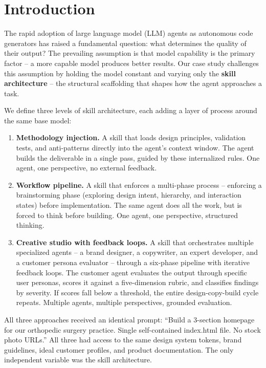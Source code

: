 \documentclass[conference]{IEEEtran}
\begin{document}
\section{Introduction}\label{introduction}

The rapid adoption of large language model (LLM) agents as autonomous code generators has raised a fundamental question: what determines the quality of their output? The prevailing assumption is that model capability is the primary factor -- a more capable model produces better results. Our case study challenges this assumption by holding the model constant and varying only the \textbf{skill architecture} -- the structural scaffolding that shapes how the agent approaches a task.

We define three levels of skill architecture, each adding a layer of process around the same base model:

\begin{enumerate}
\def\labelenumi{\arabic{enumi}.}
\item
  \textbf{Methodology injection.} A skill that loads design principles, validation tests, and anti-patterns directly into the agent's context window. The agent builds the deliverable in a single pass, guided by these internalized rules. One agent, one perspective, no external feedback.
\item
  \textbf{Workflow pipeline.} A skill that enforces a multi-phase process -- enforcing a brainstorming phase (exploring design intent, hierarchy, and interaction states) before implementation. The same agent does all the work, but is forced to think before building. One agent, one perspective, structured thinking.
\item
  \textbf{Creative studio with feedback loops.} A skill that orchestrates multiple specialized agents -- a brand designer, a copywriter, an expert developer, and a customer persona evaluator -- through a six-phase pipeline with iterative feedback loops. The customer agent evaluates the output through specific user personas, scores it against a five-dimension rubric, and classifies findings by severity. If scores fall below a threshold, the entire design-copy-build cycle repeats. Multiple agents, multiple perspectives, grounded evaluation.
\end{enumerate}

All three approaches received an identical prompt: ``Build a 3-section homepage for our orthopedic surgery practice. Single self-contained index.html file. No stock photo URLs.'' All three had access to the same design system tokens, brand guidelines, ideal customer profiles, and product documentation. The only independent variable was the skill architecture.
\end{document}
